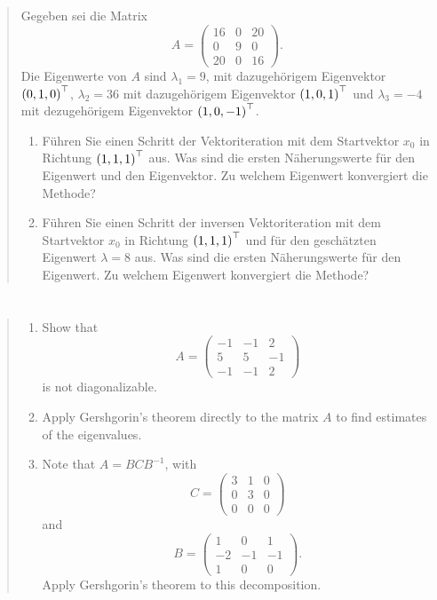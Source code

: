 \documentclass{exercise}
\begin{document}
	\section{}

	\begin{quote}
		Gegeben sei die Matrix
		\[
			A = \begin{pmatrix}
				16 & 0 & 20\\
				0 & 9 & 0\\
				20 & 0 & 16
			\end{pmatrix}.
		\]
		Die Eigenwerte von \(A\) sind \(\lambda_1 = 9\), mit dazugehörigem Eigenvektor \(\parentheses*{0, 1, 0}^\top\), \(\lambda_2 = 36\) mit dazugehörigem Eigenvektor \(\parentheses*{1, 0, 1}^\top\) und \(\lambda_3 = -4\) mit dezugehörigem Eigenvektor \(\parentheses*{1, 0, -1}^\top\).
		\begin{enumerate}
			\item Führen Sie einen Schritt der Vektoriteration mit dem Startvektor \(x_0\) in Richtung \(\parentheses*{1, 1, 1}^\top\) aus.
			Was sind die ersten Näherungswerte für den Eigenwert und den Eigenvektor.
			Zu welchem Eigenwert konvergiert die Methode?
			\item Führen Sie einen Schritt der inversen Vektoriteration mit dem Startvektor \(x_0\) in Richtung \(\parentheses*{1, 1, 1}^\top\) und für den geschätzten Eigenwert \(\lambda = 8\) aus.
			Was sind die ersten Näherungswerte für den Eigenwert.
			Zu welchem Eigenwert konvergiert die Methode?
		\end{enumerate}
	\end{quote}


	\section{}

	\begin{quote}
		\begin{enumerate}
			\item Show that
			\[
				A = \begin{pmatrix}
					-1 & -1 & 2\\
					5 & 5 & -1\\
					-1 & -1 & 2
				\end{pmatrix}
			\]
			is not diagonalizable.
			\item Apply Gershgorin's theorem directly to the matrix \(A\) to find estimates of the eigenvalues.
			\item Note that \(A = BCB^{-1}\), with
			\[
				C = \begin{pmatrix}
					3 & 1 & 0\\
					0 & 3 & 0\\
					0 & 0 & 0
				\end{pmatrix}
			\]
			and
			\[
				B = \begin{pmatrix}
					1 & 0 & 1\\
					-2 & -1 & -1\\
					1 & 0 & 0
				\end{pmatrix}.
			\]
			Apply Gershgorin's theorem to this decomposition.
		\end{enumerate}
	\end{quote}
\end{document}
